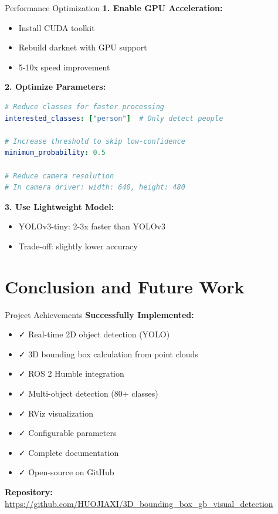 \documentclass[aspectratio=169]{beamer}
\begin{document}
\begin{frame}[fragile]{Performance Optimization}
\textbf{1. Enable GPU Acceleration:}
\begin{itemize}
    \item Install CUDA toolkit
    \item Rebuild darknet with GPU support
    \item 5-10x speed improvement
\end{itemize}

\vspace{0.5em}
\textbf{2. Optimize Parameters:}
\begin{lstlisting}[language=yaml, basicstyle=\tiny\ttfamily]
# Reduce classes for faster processing
interested_classes: ["person"]  # Only detect people

# Increase threshold to skip low-confidence
minimum_probability: 0.5

# Reduce camera resolution
# In camera driver: width: 640, height: 480
\end{lstlisting}

\vspace{0.5em}
\textbf{3. Use Lightweight Model:}
\begin{itemize}
    \item YOLOv3-tiny: 2-3x faster than YOLOv3
    \item Trade-off: slightly lower accuracy
\end{itemize}
\end{frame}

\section{Conclusion and Future Work}

\begin{frame}{Project Achievements}
\textbf{Successfully Implemented:}
\begin{itemize}
    \item ✓ Real-time 2D object detection (YOLO)
    \item ✓ 3D bounding box calculation from point clouds
    \item ✓ ROS 2 Humble integration
    \item ✓ Multi-object detection (80+ classes)
    \item ✓ RViz visualization
    \item ✓ Configurable parameters
    \item ✓ Complete documentation
    \item ✓ Open-source on GitHub
\end{itemize}

\vspace{1em}
\textbf{Repository:}\\
\url{https://github.com/HUOJIAXI/3D_bounding_box_gb_visual_detection}
\end{frame}
\end{document}
